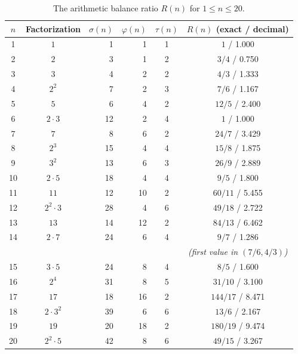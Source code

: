 \documentclass[12pt]{article}
\begin{document}
\begin{table}[h]
\centering
\caption{The arithmetic balance ratio $R(n)$ for $1\le n\le 20$.}
\label{tab:Rvalues}
\begin{tabular}{c|crrcc}
\toprule
$n$ & Factorization & $\sigma(n)$ & $\varphi(n)$ & $\tau(n)$ & $R(n)$ (exact / decimal) \\
\midrule
1  & $1$         & 1   & 1  & 1 & $1$ \quad / 1.000 \\
2  & $2$         & 3   & 1  & 2 & $3/4$ \quad / 0.750 \\
3  & $3$         & 4   & 2  & 2 & $4/3$ \quad / 1.333 \\
4  & $2^2$       & 7   & 2  & 3 & $7/6$ \quad / 1.167 \\
5  & $5$         & 6   & 4  & 2 & $12/5$ \quad / 2.400 \\
6  & $2\cdot3$   & 12  & 2  & 4 & $1$ \quad / 1.000 \\
7  & $7$         & 8   & 6  & 2 & $24/7$ \quad / 3.429 \\
8  & $2^3$       & 15  & 4  & 4 & $15/8$ \quad / 1.875 \\
9  & $3^2$       & 13  & 6  & 3 & $26/9$ \quad / 2.889 \\
10 & $2\cdot5$   & 18  & 4  & 4 & $9/5$ \quad / 1.800 \\
11 & $11$        & 12  & 10 & 2 & $60/11$ \quad / 5.455 \\
12 & $2^2\cdot3$ & 28  & 4  & 6 & $49/18$ \quad / 2.722 \\
13 & $13$        & 14  & 12 & 2 & $84/13$ \quad / 6.462 \\
14 & $2\cdot7$   & 24  & 6  & 4 & $9/7$ \quad / 1.286 \\[2pt]
   &             &     &    &   & \emph{(first value in $(7/6, 4/3)$)} \\
15 & $3\cdot5$   & 24  & 8  & 4 & $8/5$ \quad / 1.600 \\
16 & $2^4$       & 31  & 8  & 5 & $31/10$ \quad / 3.100 \\
17 & $17$        & 18  & 16 & 2 & $144/17$ \quad / 8.471 \\
18 & $2\cdot3^2$ & 39  & 6  & 6 & $13/6$ \quad / 2.167 \\
19 & $19$        & 20  & 18 & 2 & $180/19$ \quad / 9.474 \\
20 & $2^2\cdot5$ & 42  & 8  & 6 & $49/15$ \quad / 3.267 \\
\bottomrule
\end{tabular}
\end{table}
\end{document}
